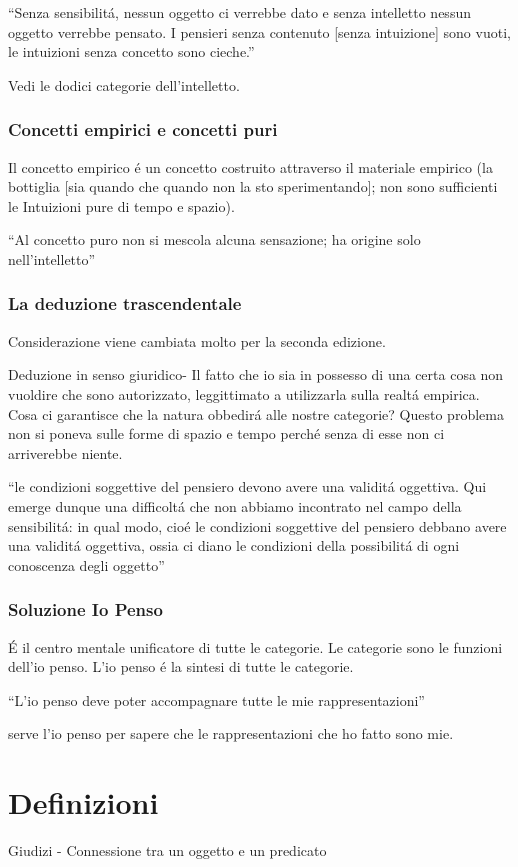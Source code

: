 \documentclass{article}
\begin{document}
``Senza sensibilitá, nessun oggetto ci verrebbe dato e senza intelletto nessun oggetto verrebbe pensato. I pensieri senza contenuto [senza intuizione] sono vuoti, le intuizioni senza concetto sono cieche.''

Vedi le dodici categorie dell'intelletto.
\subsubsection{Concetti empirici e concetti puri}
Il concetto empirico é un concetto costruito attraverso il materiale empirico (la bottiglia [sia quando che quando non la sto sperimentando]; non sono sufficienti le Intuizioni pure di tempo e spazio).

``Al concetto puro non si mescola alcuna sensazione; ha origine solo nell'intelletto''
\subsubsection{La deduzione trascendentale}
Considerazione viene cambiata molto per la seconda edizione.

Deduzione in senso giuridico- Il fatto che io sia in possesso di una certa cosa non vuoldire che sono autorizzato, leggittimato a utilizzarla sulla realtá empirica. Cosa ci garantisce che la natura obbedirá alle nostre categorie? Questo problema non si poneva sulle forme di spazio e tempo perché senza di esse non ci arriverebbe niente.

``le condizioni soggettive del pensiero devono avere una validitá oggettiva. Qui emerge dunque una difficoltá che non abbiamo incontrato nel campo della sensibilitá: in qual modo, cioé le condizioni soggettive del pensiero debbano avere una validitá oggettiva, ossia ci diano le condizioni della possibilitá di ogni conoscenza degli oggetto''
\subsubsection{Soluzione Io Penso}
É il centro mentale unificatore di tutte le categorie. Le categorie sono le funzioni dell'io penso. L'io penso é la sintesi di tutte le categorie.

``L'io penso deve poter accompagnare tutte le mie rappresentazioni''

serve l'io penso per sapere che le rappresentazioni che ho fatto sono mie.
\section*{Definizioni}
Giudizi - Connessione tra un oggetto e un predicato
\end{document}
